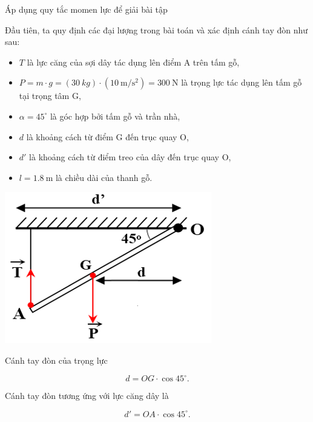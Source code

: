\begin{dang}{Áp dụng quy tắc momen lực để giải bài tập}
{		Đầu tiên, ta quy định các đại lượng trong bài toán và xác định cánh tay đòn như sau: 
		\begin{itemize}
			\item $T$ là lực căng của sợi dây tác dụng lên điểm A trên tấm gỗ, 
			\item $P=m\cdot g= \left(\SI{30}{kg}\right)\cdot\left(\SI{10}{\meter/\second^2}\right) = \SI{300}{\newton}$ là trọng lực tác dụng lên tấm gỗ tại trọng tâm G, 
			\item $\alpha = 45^{\circ}$ là góc hợp bởi tấm gỗ và trần nhà, 
			\item $d$ là khoảng cách từ điểm G đến trục quay O,
			\item $d'$ là khoảng cách từ điểm treo của dây đến trục quay O,
			\item $l=\SI{1,8}{\meter}$ là chiều dài của thanh gỗ. 
		\end{itemize}
		\begin{center}
			\includegraphics[scale=0.7]{../figs/VN10-PH-21-L-016-2-V2-03.png}
		\end{center}
		Cánh tay đòn của trọng lực
		
		$$d=\si{OG}\cdot\cos 45^{\circ}.$$
		
		Cánh tay đòn tương ứng với lực căng dây là
		
		$$d' = \si{OA}\cdot \cos 45^{\circ} .$$
		
}
\end{dang}
